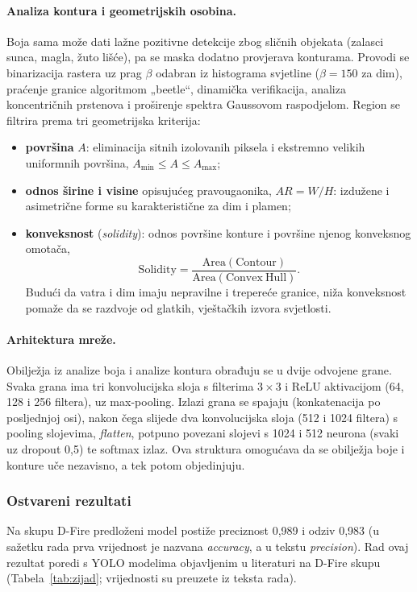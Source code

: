 \paragraph{Analiza kontura i geometrijskih osobina.} Boja sama može dati lažne pozitivne detekcije zbog sličnih objekata (zalasci sunca, magla, žuto lišće), pa se maska dodatno provjerava konturama. Provodi se binarizacija rastera uz prag $\beta$ odabran iz histograma svjetline ($\beta = 150$ za dim), praćenje granice algoritmom „beetle“, dinamička verifikacija, analiza koncentričnih prstenova i proširenje spektra Gaussovom raspodjelom. Region se filtrira prema tri geometrijska kriterija:
\begin{itemize}
  \item \textbf{površina} $A$: eliminacija sitnih izolovanih piksela i ekstremno velikih uniformnih površina, $A_{\min} \le A \le A_{\max}$;
  \item \textbf{odnos širine i visine} opisujućeg pravougaonika, $AR = W/H$: izdužene i asimetrične forme su karakteristične za dim i plamen;
  \item \textbf{konveksnost} (\emph{solidity}): odnos površine konture i površine njenog konveksnog omotača,
  \begin{equation}
  \mathrm{Solidity} = \frac{\mathrm{Area}(\mathrm{Contour})}{\mathrm{Area}(\mathrm{Convex\ Hull})}.
  \end{equation}
  Budući da vatra i dim imaju nepravilne i trepereće granice, niža konveksnost pomaže da se razdvoje od glatkih, vještačkih izvora svjetlosti.
\end{itemize}

\paragraph{Arhitektura mreže.} Obilježja iz analize boja i analize kontura obrađuju se u dvije odvojene grane. Svaka grana ima tri konvolucijska sloja s filterima $3\times 3$ i ReLU aktivacijom (64, 128 i 256 filtera), uz max-pooling. Izlazi grana se spajaju (konkatenacija po posljednjoj osi), nakon čega slijede dva konvolucijska sloja (512 i 1024 filtera) s pooling slojevima, \emph{flatten}, potpuno povezani slojevi s 1024 i 512 neurona (svaki uz dropout 0,5) te softmax izlaz. Ova struktura omogućava da se obilježja boje i konture uče nezavisno, a tek potom objedinjuju.

\subsubsection{Ostvareni rezultati}
Na skupu D-Fire predloženi model postiže preciznost 0,989 i odziv 0,983 (u sažetku rada prva vrijednost je nazvana \emph{accuracy}, a u tekstu \emph{precision}). Rad ovaj rezultat poredi s YOLO modelima objavljenim u literaturi na D-Fire skupu (Tabela~\ref{tab:zijad}; vrijednosti su preuzete iz teksta rada).

